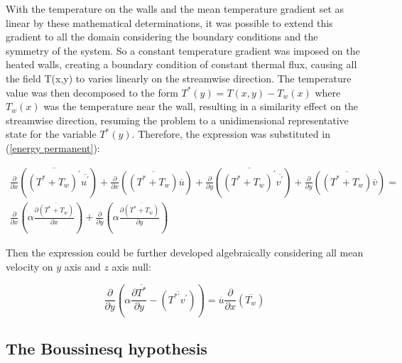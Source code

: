 \documentclass[10pt]{article} %
\begin{document}
With the temperature on the walls and the mean temperature gradient set as linear by these mathematical determinations, it was possible to extend this gradient to all the domain considering the boundary conditions and the symmetry of the system. So a constant temperature gradient was imposed on the heated walls, creating a boundary condition of constant thermal flux, causing all the field T(x,y) to varies linearly on the streamwise direction. The temperature value was then decomposed to the form $ T^\ast(y) = T(x,y) - T_w(x) $ where $T_w(x)$ was the temperature near the wall, resulting in a similarity effect on the streamwise direction, resuming the problem to a unidimensional representative state for the variable $T^\ast(y)$. Therefore, the expression was substituted in (\ref{energy permanent}):



\begin{equation}
\begin{split}
\frac{\partial{}}{\partial{x}} \left(\overline{(T^\ast + T_w)^\prime} \overline{ u^\prime}\right) + \frac{\partial{}}{\partial{x}}\left(\overline{(T^\ast + T_w)} \overline{u}\right)+ 
\frac{\partial{}}{\partial{y}} \left(\overline{(T^\ast + T_w)^\prime} \overline{ v^\prime}\right) + \frac{\partial{}}{\partial{y}}\left(\overline{(T^\ast + T_w)} \overline{v}\right) = \\
{\frac{\partial{}}{\partial{x}}} \left(\alpha {\frac{\partial{\overline{(T^\ast + T_w)}}}{\partial{x}}} \right) +
{\frac{\partial{}}{\partial{y}}} \left(\alpha {\frac{\partial{\overline{(T^\ast + T_w)}}}{\partial{y}}} \right) 
\end{split}
\end{equation}

Then the expression could be further developed algebraically considering all mean velocity on $y$ axis and $z$ axis null:

\begin{equation}\label{equation_var}
{\frac{\partial{}}{\partial{y}}} \left(\alpha {\frac{\partial{\overline{T^\ast}}}{\partial{y}}}   
- \left(\overline{ T^{\ast\prime} v^\prime}\right) \right)
= 
\overline{u}\frac{\partial{}}{\partial{x}}\left(\overline{T_w}\right)  
\end{equation}



\subsection{The Boussinesq hypothesis}
\end{document}
